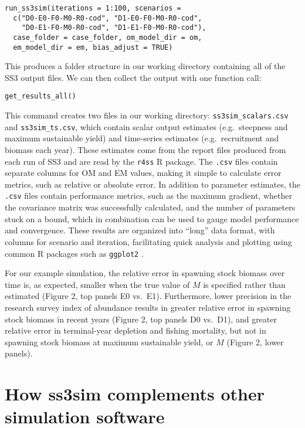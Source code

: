 \documentclass[10pt]{article}
\begin{document}
\begin{verbatim}
run_ss3sim(iterations = 1:100, scenarios =
  c("D0-E0-F0-M0-R0-cod", "D1-E0-F0-M0-R0-cod",
    "D0-E1-F0-M0-R0-cod", "D1-E1-F0-M0-R0-cod"),
  case_folder = case_folder, om_model_dir = om,
  em_model_dir = em, bias_adjust = TRUE)
\end{verbatim}

This produces a folder structure in our working directory containing all of the SS3 output files. We can then collect the output with one function call:

\begin{verbatim}
get_results_all()
\end{verbatim}

\noindent
This command creates two files in our working directory: \texttt{ss3sim\_scalars.csv} and \texttt{ss3sim\_ts.csv}, which contain scalar output estimates (e.g.~steepness and maximum sustainable yield) and time-series estimates (e.g.~recruitment and biomass each year). These estimates come from the report files produced from each run of SS3 and are read by the \texttt{r4ss} R package. The \texttt{.csv} files contain separate columns for OM and EM values, making it simple to calculate error metrics, such as relative or absolute error. In addition to parameter estimates, the \texttt{.csv} files contain performance metrics, such as the maximum gradient, whether the covariance matrix was successfully calculated, and the number of parameters stuck on a bound, which in combination can be used to gauge model performance and convergence. These results are organized into ``long'' data format, with columns for scenario and iteration, facilitating quick analysis and plotting using common R packages such as \texttt{ggplot2} \cite{wickham2009}.

For our example simulation, the relative error in spawning stock biomass over time is, as expected, smaller when the true value of $M$ is specified rather than estimated (Figure 2, top panels E0 vs.~E1). Furthermore, lower precision in the research survey index of abundance results in greater relative error in spawning stock biomass in recent years (Figure 2, top panels D0 vs.~D1), and greater relative error in terminal-year depletion and fishing mortality, but not in spawning stock biomass at maximum sustainable yield, or $M$ (Figure 2, lower panels).

\section*{How ss3sim complements other simulation software}
\end{document}
